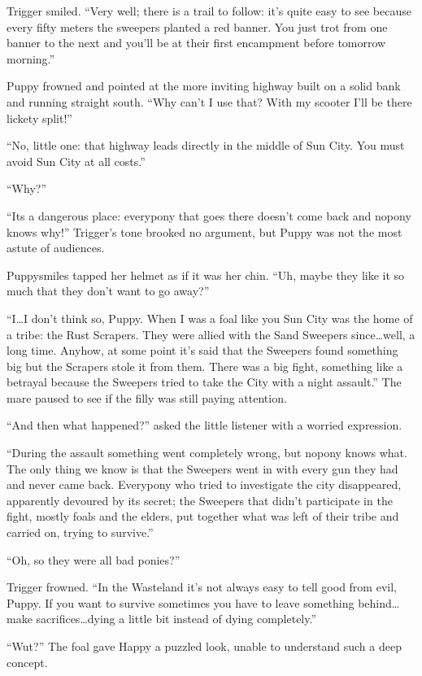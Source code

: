 Trigger smiled. ``Very well; there is a trail to follow: it's quite easy to see because every fifty meters the sweepers planted a red banner. You just trot from one banner to the next and you'll be at their first encampment before tomorrow morning.''

Puppy frowned and pointed at the more inviting highway built on a solid bank and running straight south. ``Why can't I use that? With my scooter I'll be there lickety split!''

``No, little one: that highway leads directly in the middle of Sun City. You must avoid Sun City at all costs.''

``Why?''

``Its a dangerous place: everypony that goes there doesn't come back and nopony knows why!'' Trigger's tone brooked no argument, but Puppy was not the most astute of audiences.

Puppysmiles tapped her helmet as if it was her chin. ``Uh, maybe they like it so much that they don't want to go away?''

``I\dots I don't think so, Puppy. When I was a foal like you Sun City was the home of a tribe: the Rust Scrapers. They were allied with the Sand Sweepers since\dots well, a long time. Anyhow, at some point it's said that the Sweepers found something big but the Scrapers stole it from them. There was a big fight, something like a betrayal because the Sweepers tried to take the City with a night assault.'' The mare paused to see if the filly was still paying attention.

``And then what happened?'' asked the little listener with a worried expression.

``During the assault something went completely wrong, but nopony knows what. The only thing we know is that the Sweepers went in with every gun they had and never came back. Everypony who tried to investigate the city disappeared, apparently devoured by its secret; the Sweepers that didn't participate in the fight, mostly foals and the elders, put together what was left of their tribe and carried on, trying to survive.''

``Oh, so they were all bad ponies?''

Trigger frowned. ``In the Wasteland it's not always easy to tell good from evil, Puppy. If you want to survive sometimes you have to leave something behind\dots make sacrifices\dots dying a little bit instead of dying completely.''

``Wut?'' The foal gave Happy a puzzled look, unable to understand such a deep concept.

